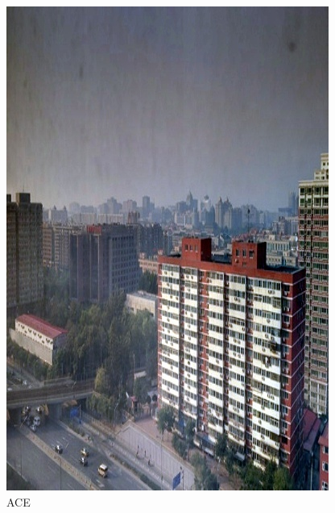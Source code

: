 \documentclass[12pt]{article}
\begin{document}
\begin{figure}[!h]
\begin{minipage}[t]{0.24\linewidth}
        \includegraphics[width=0.9\linewidth]{sample_pictures/after_RESIDE_ACE.jpg}
        \caption*{ACE}
    \end{minipage}\begin{minipage}[t]{0.24\linewidth}
        \centering

\end{minipage}
\end{figure}
\end{document}
